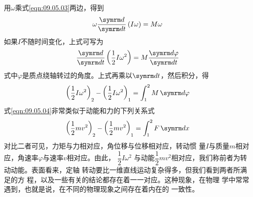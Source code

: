 用$ \omega $乘式\eqref{eqn:09.05.03}两边，得到
\begin{equation*}
 \omega \frac { \dif } { \dif t } \left( I \omega \right) = M \omega
\end{equation*}
如果$ I $不随时间变化，上式可写为
\begin{equation*}
 \frac { \dif } { \dif t } \left( \frac { 1 } { 2 } I \omega ^ { 2 } \right) = M \frac { \dif \varphi } { \dif t }
\end{equation*}
式中$ \varphi $是质点绕轴转过的角度。上式再乘以$ \dif t $，然后积分，得
\begin{equation}\label{eqn:09.05.04}
    { \left( \frac { 1 } { 2 } I \omega ^ { 2 } \right) } _ { 2 } - { \left( \frac { 1 } { 2 } I \omega ^ { 2 } \right) } _ { 1 } = \int _ 1 ^ { 2 } M \dif \varphi
\end{equation}
式\eqref{eqn:09.05.04}非常类似于动能和力的下列关系式
\begin{equation*}
    { \left( \frac { 1 } { 2 } m v ^ { 2 } \right) } _ { 2 } - { \left( \frac { 1 } { 2 } m v ^ { 2 } \right) } _ { 1 } = \int _ { 1 } ^ { 2 } F \dif x
\end{equation*}
对比二者可见，力矩与力相对应，角位移与位移相对应，转动惯
量$ I $与质量$ m $相对应，角速率$ \varphi $与速率$ v $相对应。由此，
$ \dfrac { 1 } { 2 } I \omega ^ { 2 }  $
与动能$ \dfrac { 1 } { 2 } m v ^ { 2 } $相对应，我们称前者为转动动能。表面看来，定轴
转动要比一维直线运动复杂得多，但我们看到两者所满足的方
程，以及一些有关的结论都存在着一一对应。这种现象，在物理
学中常常遇到，也就是说，在不同的物理现象之间存在着内在的
一致性。